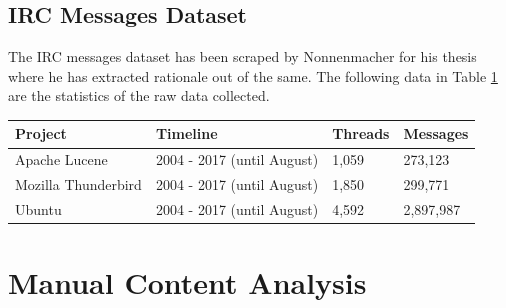 \documentclass[a4paper,12pt,twoside]{report}
\begin{document}

\section{IRC Messages Dataset}

The IRC messages dataset has been scraped by Nonnenmacher \cite{Nonnenmacher2017} for his thesis where he has extracted rationale out of the same. The following data in Table \ref{tab:rawIRCMessages} are the statistics of the raw data collected. 

\begin{table} %
    \centering
    \begin{adjustbox}{max width=\columnwidth}
    \def\arraystretch{1} %
    \begin{tabular}{p{4cm} p{5cm} p{2cm} p{3cm}}
        \toprule
        \textbf{Project} & \textbf{Timeline} & \textbf{Threads} & \textbf{Messages}\\
        \midrule
			Apache Lucene & 2004 - 2017 (until August) & 1,059 & 273,123\\
			Mozilla Thunderbird & 2004 - 2017 (until August) & 1,850 & 299,771\\ 
			Ubuntu & 2004 - 2017 (until August) & 4,592 & 2,897,987\\
        \midrule
    \end{tabular}
    \end{adjustbox}
    \label{tab:rawIRCMessages}
\end{table}


\chapter{Manual Content Analysis}
\end{document}
